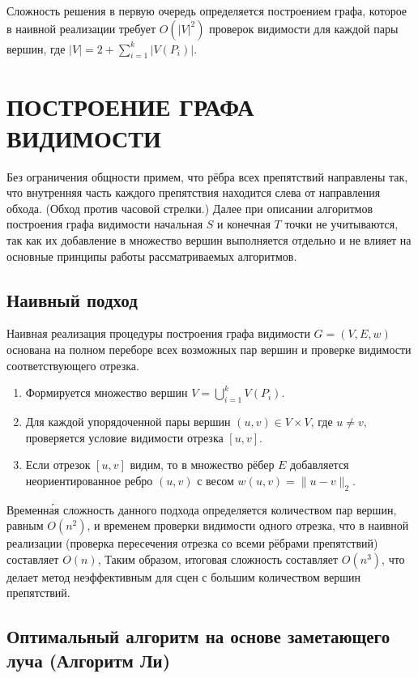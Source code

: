\documentclass[intlimits,twoside,a4paper,11pt]{article}
\theoremstyle{definition}
\begin{document}
Сложность решения в первую очередь определяется построением графа, которое в наивной реализации требует $O(|V|^2)$ проверок видимости
для каждой пары вершин, где $|V| = 2 + \sum_{i=1}^k |V(P_i)|$. 

\section{ПОСТРОЕНИЕ ГРАФА ВИДИМОСТИ}
\label{sec:construction}
Без ограничения общности примем, что рёбра всех препятствий направлены так, что внутренняя часть каждого препятствия находится слева от направления обхода. (Обход против часовой стрелки.)
Далее при описании алгоритмов построения графа видимости начальная $S$ и конечная $T$ точки не учитываются, так как их добавление в множество вершин выполняется отдельно и не влияет на
основные принципы работы рассматриваемых алгоритмов.

\subsection{Наивный подход}

Наивная реализация процедуры построения графа видимости $G=(V,E,w)$ основана на полном переборе всех возможных пар вершин
и проверке видимости соответствующего отрезка.

\begin{enumerate}
    \item[\textbf{Шаг 1.}] Формируется множество вершин $V = \bigcup_{i=1}^k V(P_i)$.
    \item[\textbf{Шаг 2.}] Для каждой упорядоченной пары вершин $(u, v) \in V \times V$, где $u \neq v$, проверяется условие видимости отрезка $[u, v]$.
    \item[\textbf{Шаг 3.}] Если отрезок $[u, v]$ видим, то в множество рёбер $E$ добавляется неориентированное ребро $(u, v)$ с весом $w(u,v) = \|u - v\|_2$.
\end{enumerate}

Временн\'{а}я сложность данного подхода определяется количеством пар вершин, равным $O(n^2)$,
и временем проверки видимости одного отрезка, что в наивной реализации (проверка пересечения
отрезка со всеми рёбрами препятствий) составляет $O(n)$,
Таким образом, итоговая сложность составляет $O(n^3)$, 
что делает метод неэффективным для сцен с большим количеством вершин препятствий.

\subsection{Оптимальный алгоритм на основе заметающего луча (Алгоритм Ли)}
\end{document}
